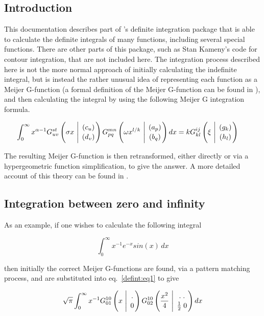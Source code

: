 \newcommand{\MeijerGparams}[2]{\genfrac{}{}{0pt}{}{#1}{#2}}
\subsection{Introduction}
This documentation describes part of \REDUCE's definite
integration package that is able to calculate the definite integrals of
many functions, including several special functions.  There are other
parts of this package, such as Stan Kameny's code for contour integration,
that are not included here.  The integration process described here is not
the more normal approach of initially calculating the indefinite integral,
but is instead the rather unusual idea of representing each function as a
Meijer G-function (a formal definition of the Meijer G-function can be
found in \cite {Prudnikov:90c}), and then calculating the integral by using
the following Meijer G integration formula.

\begin{equation}
\int_{0}^{\infty} x^{\alpha-1} G^{s t}_{u v} 
\left( \sigma x \  \Bigg\vert \  \MeijerGparams{( c_u)}{(d_v)} \right) 
G^{m n}_{p q} \left( \omega x^{l/k} \  \Bigg\vert \ \MeijerGparams{(a_p)}{(b_q)}
\right) dx = k G^{i j}_{k l} \left( \xi \ \Bigg\vert \ 
\MeijerGparams{(g_k)}{(h_l)} \right)  \hspace{5mm} \label{defint:eq1}
\end{equation}

The resulting Meijer G-function is then retransformed, either directly
or via a hypergeometric function simplification, to give
the answer. A more detailed account of this theory can be found in 
\cite {Adamchik90}.

\subsection{Integration between zero and infinity}

As an example, if one wishes to calculate the following integral

\begin{displaymath}
\int_{0}^{\infty} x^{-1} e^{-x} sin(x) \, dx
\end{displaymath}

then initially the  correct Meijer G-functions are found, via a 
pattern matching 
process, and are substituted into eq.~\ref{defint:eq1} to give

\begin{displaymath}
\sqrt{\pi} \int_{0}^{\infty} x^{-1} G^{1 0}_{0 1} \left(x 
\ \Bigg\vert \ 
\MeijerGparams{.}{0}\right) G^{1 0}_{0 2}\left(\frac{x^{2}}{4} 
\ \Bigg\vert \ \MeijerGparams{. \; . }{\frac{1}{2} \; 0} \right) dx
\end{displaymath}

